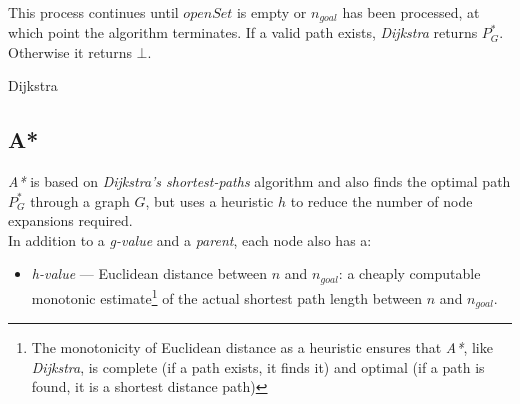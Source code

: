 \documentclass[12pt,notitlepage]{report}
\begin{document}
\\
\noindent
This process continues until $openSet$ is empty or $n_{goal}$ has been processed, at which point the algorithm terminates. If a valid path exists, {\em Dijkstra} returns $P^{*}_{G}$. Otherwise it returns $\bot$.\

\begin{algorithm}
  \SetAlgoLined\DontPrintSemicolon
  \setcounter{AlgoLine}{0}
  \caption{{\sc Dijkstra}}
\end{algorithm} 

\subsection {A*}

{\em A*} is based on {\em Dijkstra's shortest-paths} algorithm and also finds the optimal path $P^{*}_{G}$ through a graph $G$, but uses a heuristic $h$ to reduce the number of node expansions required.\cite{Hart68}\\

\noindent
In addition to a {\em g-value} and a {\em parent}, each node also has a:
\begin{itemize}
\item {\em h-value} --- Euclidean distance between {$n$} and {$n_{goal}$}: a cheaply computable monotonic estimate\footnote{The monotonicity of Euclidean distance as a heuristic ensures that {\em A*}, like {\em Dijkstra}, is complete (if a path exists, it finds it) and optimal (if a path is found, it is a shortest distance path)} of the actual shortest path length between $n$ and $n_{goal}$.
\end{itemize}
\end{document}
